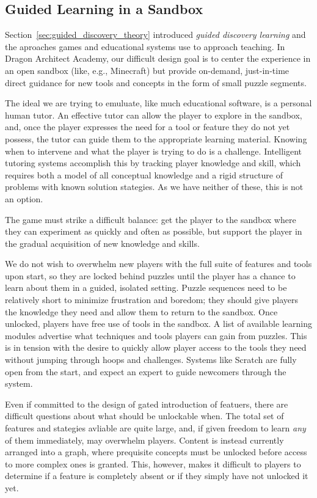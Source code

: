 \documentclass{sig-alternate}
\newcommand{\gametitle}{{\color{RoyalPurple} Dragon Architect Academy}}
\begin{document}
\subsection{Guided Learning in a Sandbox}
\label{sec:direct_guidance}

Section~\ref{sec:guided_discovery_theory} introduced \emph{guided discovery learning} and the  aproaches games and educational systems use to approach teaching.
In \gametitle{}, our difficult design goal is to center the experience in an open sandbox (like, e.g., Minecraft) but provide on-demand, just-in-time direct guidance for new tools and concepts in the form of small puzzle segments.

The ideal we are trying to emuluate, like much educational software, is a personal human tutor.
An effective tutor can allow the player to explore in the sandbox, and, once the player expresses the need for a tool or feature they do not yet possess, the tutor can guide them to the appropriate learning material.
Knowing when to intervene and what the player is trying to do is a challenge.
Intelligent tutoring systems accomplish this by tracking player knowledge and skill, which requires both a model of all conceptual knowledge and a rigid structure of problems with known solution stategies.
As we have neither of these, this is not an option.

The game must strike a difficult balance: get the player to the sandbox where they can experiment as quickly and often as possible, but support the player in the gradual acquisition of new knowledge and skills. 

We do not wish to overwhelm new players with the full suite of features and tools upon start, so they are locked behind puzzles until the player has a chance to learn about them in a guided, isolated setting.
Puzzle sequences need to be relatively short to minimize frustration and boredom; they should give players the knowledge they need and allow them to return to the sandbox.
Once unlocked, players have free use of tools in the sandbox.
A list of available learning modules advertise what techniques and tools players can gain from puzzles.
This is in tension with the desire to quickly allow player access to the tools they need without jumping through hoops and challenges. Systems like Scratch are fully open from the start, and expect an expert to guide newcomers through the system.

Even if committed to the design of gated introduction of featuers, there are difficult questions about what should be unlockable when.
The total set of features and stategies avliable are quite large, and, if given freedom to learn \emph{any} of them immediately, may overwhelm players.
Content is instead currently arranged into a graph, where prequisite concepts must be unlocked before access to more complex ones is granted.
This, however, makes it difficult to players to determine if a feature is completely absent or if they simply have not unlocked it yet.
\end{document}
